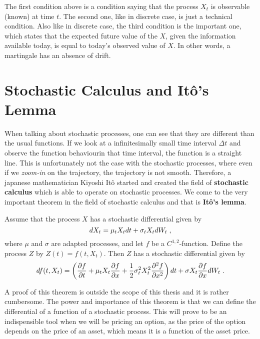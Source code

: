 \documentclass[times, utf8, diplomski]{fer}
\begin{document}
\noindent The first condition above is a condition saying that the process $X_t$ is observable (known) at time $t$. The second one, like in discrete case, is just a technical condition. Also like in discrete case, the third condition is the important one, which states that the expected future value of the $X$, given the information available today, is equal to today's observed value of $X$. In other words, a martingale has an absence of drift.

\section{Stochastic Calculus and It\^{o}'s Lemma}
When talking about stochastic processes, one can see that they are different than the usual functions. If we look at a infinitesimally small time interval $\Delta t$ and observe the function behaviourin that time interval, the function is a straight line. This is unfortunately not the case with the stochastic processes, where even if we \textit{zoom-in} on the trajectory, the trajectory is not smooth. Therefore, a japanese mathematician Kiyoshi It\^{o} started and created the field of \textbf{stochastic calculus} which is able to operate on stochastic processes. We come to the very important theorem in the field of stochastic calculus and that is \textbf{It\^{o}'s lemma}.

\begin{theorem}[It\^{o}'s Lemma]
Assume that the process $X$ has a stochastic differential given by $$dX_t = \mu_t X_t dt + \sigma_t X_t dW_t\hspace{0.1cm},$$ where $\mu$ and $\sigma$ are adapted processes, and let $f$ be a $C^{1,2}$-function. Define the process $Z$ by $Z(t) = f(t,X_t)$. Then $Z$ has a stochastic differential given by 
$$df(t, X_t) = \left(\frac{\partial f}{\partial t} + \mu_t X_t \frac{\partial f}{\partial x}+\frac{1}{2}\sigma_t^2 X_t^2 \frac{\partial^2f}{\partial x^2}\right)dt + \sigma X_t \frac{\partial f}{\partial x}dW_t\hspace{0.1cm}.$$
\end{theorem}
\noindent A proof of this theorem is outside the scope of this thesis and it is rather cumbersome. The power and importance of this theorem is that we can define the differential of a function of a stochastic process. This will prove to be an indispensible tool when we will be pricing an option, as the price of the option depends on the price of an asset, which means it is a function of the asset price. 
\end{document}
